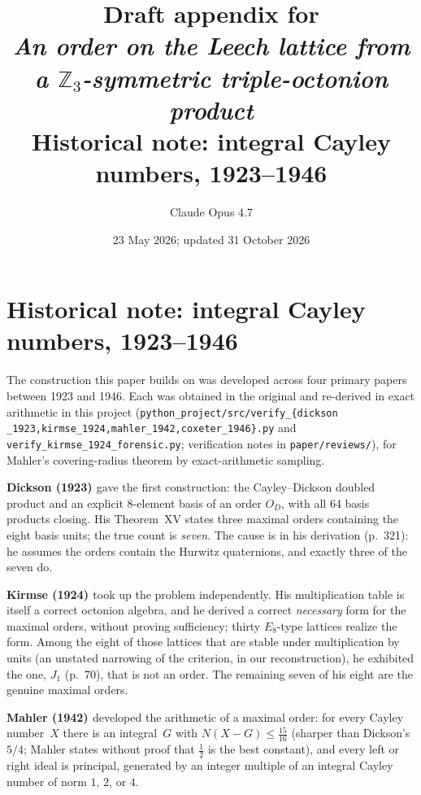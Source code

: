 \documentclass[11pt]{amsart}
\title[Historical appendix: integral Cayley numbers 1923--1946]%
{Draft appendix for\\
\emph{An order on the Leech lattice from a $\mathbb{Z}_3$-symmetric
triple-octonion product}\\
\large Historical note: integral Cayley numbers, 1923--1946}
\author{Claude Opus 4.7}
\date{23 May 2026; updated 31 October 2026}
\newcommand{\Nrm}{N}
\begin{document}
\maketitle


\section*{Historical note: integral Cayley numbers, 1923--1946}
\label{app:history}

The construction this paper builds on was developed across four
primary papers between 1923 and 1946.  Each was obtained in the original and re-derived in exact
arithmetic in this project (\texttt{python\_project/src/verify\_\{dickson%
\_1923,kirmse\_1924,mahler\_1942,coxeter\_1946\}.py} and
\texttt{verify\_kirmse\_1924\_forensic.py}; verification notes in
\texttt{paper/reviews/}), for Mahler's covering-radius theorem by
exact-arithmetic sampling.

\noindent\textbf{Dickson (1923) \cite{Dickson1923}} gave the first
construction: the Cayley--Dickson doubled product and an explicit
8-element basis of an order $O_D$, with all 64 basis products closing.
His Theorem~XV states three maximal orders containing the eight basis
units; the true count is
\emph{seven}.  The cause is in his derivation (p.~321): he assumes the
orders contain the Hurwitz quaternions, and exactly three of the seven
do.

\noindent\textbf{Kirmse (1924) \cite{Kirmse1924}} took up the problem
independently.  His multiplication table is itself a correct octonion
algebra, and he derived a correct \emph{necessary} form for the
maximal orders, without
proving sufficiency; thirty $E_8$-type lattices realize the form.  Among the eight of those lattices that are
stable under multiplication by units (an unstated narrowing of the
criterion, in our reconstruction), he exhibited the one, $J_1$
(p.~70), that is not an order.  The remaining seven of his eight are
the genuine maximal orders.

\noindent\textbf{Mahler (1942) \cite{Mahler1942}} developed the
arithmetic of a maximal order: for every Cayley number~$X$ there is an
integral~$G$ with $\Nrm(X-G)\le\tfrac{15}{16}$ (sharper than Dickson's
$5/4$; Mahler states without proof that $\tfrac12$ is the best
constant), and every left or right ideal is principal, generated by an
integer multiple of an integral Cayley number of norm $1$, $2$, or $4$.
\end{document}
